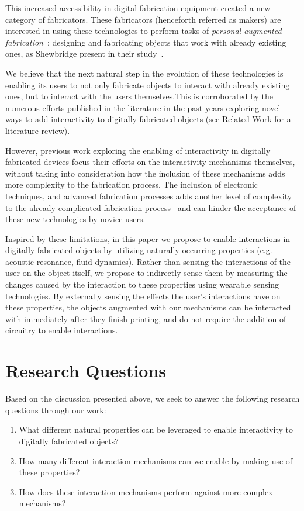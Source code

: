     This increased accessibility in digital fabrication equipment created a new
    category of fabricators. These fabricators (henceforth referred as makers)
    are interested in using these technologies to perform tasks of
    \emph{personal augmented fabrication}~\cite{Ashbrook:2016fga}: designing
    and fabricating objects that work with already existing ones, as Shewbridge
    \etal present in their study~\cite{Shewbridge:2014gl}.
    
    We believe that the next natural step in the evolution of these
    technologies is enabling its users to not only fabricate objects to
    interact with already existing ones, but to interact with the users
    themselves.This is corroborated by the numerous efforts published in the
    literature in the past years exploring novel ways to add interactivity to
    digitally fabricated objects (see Related Work for a literature review).
    
    However, previous work exploring the enabling of interactivity in digitally
    fabricated devices focus their efforts on the interactivity mechanisms
    themselves, without taking into consideration how the inclusion of these
    mechanisms adds more complexity to the fabrication process. The inclusion of
    electronic techniques, and advanced fabrication processes adds another
    level of complexity to the already complicated fabrication
    process~\cite{Hudson:2016hi, Mellis:2012ba, Weichel:2014ed} and can hinder
    the acceptance of these new technologies by novice users.
    
    Inspired by these limitations, in this paper we propose to enable
    interactions in digitally fabricated objects by utilizing naturally
    occurring properties (e.g. acoustic resonance, fluid dynamics). Rather than sensing
    the interactions of the user on the object itself, we propose to indirectly
    sense them by measuring the changes caused by the interaction to these
    properties using wearable sensing technologies. By externally sensing the
    effects the user's interactions have on these properties, the objects
    augmented with our mechanisms can be interacted with immediately after they
    finish printing, and do not require the addition of circuitry to enable
    interactions.

  \section{Research Questions}
    Based on the discussion presented above, we seek to answer the following
    research questions through our work:
    \begin{enumerate}
      \item What different natural properties can be leveraged to enable
        interactivity to digitally fabricated objects?
      \item How many different interaction mechanisms can we enable by making
        use of these properties?
      \item How does these interaction mechanisms perform against more complex
        mechanisms?
    \end{enumerate}
    
